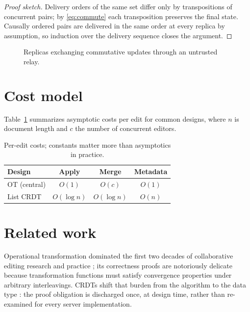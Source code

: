\documentclass[11pt]{article}
\begin{document}
\begin{proof}[Proof sketch]
Delivery orders of the same set differ only by transpositions of concurrent
pairs; by \eqref{eq:commute} each transposition preserves the final state.
Causally ordered pairs are delivered in the same order at every replica by
assumption, so induction over the delivery sequence closes the argument.
\end{proof}

\begin{figure}[t]
\centering
{}
\caption{Replicas exchanging commutative updates through an untrusted relay.}
\label{fig:topology}
\end{figure}

\section{Cost model}

Table~\ref{tab:cost} summarizes asymptotic costs per edit for common designs,
where $n$ is document length and $c$ the number of concurrent editors.

\begin{table}[htbp]
\centering
\begin{tabular}{lccc}
\toprule
Design & Apply & Merge & Metadata \\
\midrule
OT (central) & $O(1)$ & $O(c)$ & $O(1)$ \\
List CRDT & $O(\log n)$ & $O(\log n)$ & $O(n)$ \\
\bottomrule
\end{tabular}
\caption{Per-edit costs; constants matter more than asymptotics in practice.}
\label{tab:cost}
\end{table}

\section{Related work}

Operational transformation dominated the first two decades of collaborative
editing research and practice \cite{ellis1989concurrency}; its correctness
proofs are notoriously delicate because transformation functions must satisfy
convergence properties under arbitrary interleavings. CRDTs shift that burden
from the algorithm to the data type \cite{shapiro2011crdt}: the proof
obligation is discharged once, at design time, rather than re-examined for
every server implementation.
\end{document}
